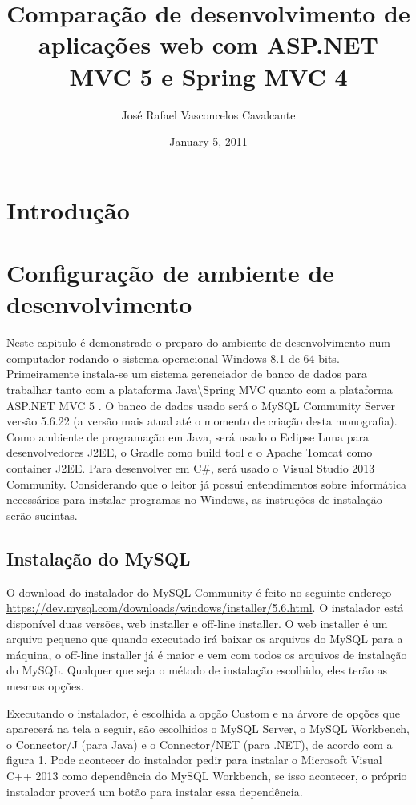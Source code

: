 \documentclass[a4paper,12pt]{article}
\newcommand{\anmvc} {
	ASP.NET MVC 5
}
\newcommand{\spring} {
	Java\textbackslash Spring MVC
}
\begin{document}
\title{Comparação de desenvolvimento de aplicações web com ASP.NET MVC 5 e Spring MVC 4}
\author{José Rafael Vasconcelos Cavalcante}
\date{January 5, 2011}
\maketitle

\section{Introdução}

\section{Configuração de ambiente de desenvolvimento}

Neste capitulo é demonstrado o preparo do ambiente de desenvolvimento num computador rodando o sistema operacional Windows 8.1 de 64 bits. Primeiramente instala-se um sistema gerenciador de banco de dados para trabalhar tanto com a plataforma \spring quanto com a plataforma \anmvc.  O banco de dados usado será o MySQL Community Server versão 5.6.22 (a versão mais atual até o momento de criação desta monografia). Como ambiente de programação em Java, será usado o Eclipse Luna para desenvolvedores J2EE, o Gradle como build tool e o Apache Tomcat como container J2EE. Para desenvolver em C\#, será usado o Visual Studio 2013 Community. Considerando que o leitor já possui entendimentos sobre informática necessários para instalar programas no Windows, as instruções de instalação serão sucintas.

\subsection{Instalação do MySQL}

O download do instalador do MySQL Community é feito no seguinte endereço \url{https://dev.mysql.com/downloads/windows/installer/5.6.html}. O instalador está disponível duas versões, web installer e off-line installer. O web installer é um arquivo pequeno que quando executado irá baixar os arquivos do MySQL para a máquina, o off-line installer já é maior e vem com todos os arquivos de instalação do MySQL. Qualquer que seja o método de instalação escolhido, eles terão as mesmas opções.

Executando o instalador, é escolhida a opção Custom e na árvore de opções que aparecerá na tela a seguir, são escolhidos o MySQL Server, o MySQL Workbench, o Connector/J (para Java) e o Connector/NET (para .NET), de acordo com a figura 1. Pode acontecer do instalador pedir para instalar o Microsoft Visual C++ 2013 como dependência do MySQL Workbench, se isso acontecer, o próprio instalador proverá um botão para instalar essa dependência.
\end{document}
